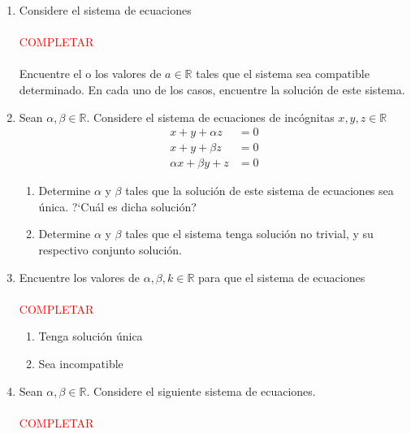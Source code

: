 \documentclass[11pt]{article}
\newcommand{\RR}{\mathbb{R}}
\begin{document}
\begin{enumerate}
  
\item Considere el sistema de ecuaciones%
  \\ \\
  
  \textcolor{red}{COMPLETAR}
  \\ \\
  
  Encuentre el o los valores de $a\in\RR$ tales que el sistema sea
  compatible determinado. En cada uno de los casos, encuentre la soluci\'on
  de este sistema.

\item Sean $\alpha,\beta\in\RR$.
  Considere el sistema de ecuaciones de incógnitas $x,y,z\in\RR$
  \begin{align*}
    x+y+\alpha z  &  =0\\
    x+y+\beta z  &  =0\\
    \alpha x+\beta y+z  &  =0
  \end{align*}
  
  
  \begin{enumerate}
  \item Determine $\alpha$ y $\beta$ tales que la soluci\'on de este sistema de
    ecuaciones sea \'unica. ?`Cu\'al es dicha soluci\'on?
    
  \item Determine $\alpha$ y $\beta$ tales que el sistema tenga soluci\'on no
    trivial, y su respectivo conjunto soluci\'on.
  \end{enumerate}
  
  
  
\item Encuentre los valores de $\alpha,\beta,k\in\RR$ para que
  el sistema de ecuaciones
  \\ \\
  
  \textcolor{red}{COMPLETAR}
          
  \begin{enumerate}
  \item Tenga soluci\'on \'unica
    
  \item Sea incompatible
  \end{enumerate}
  
  
\item Sean $\alpha,\beta\in\RR$. Considere el siguiente sistema de
  ecuaciones.
  \\ \\
  \textcolor{red}{COMPLETAR}
  

\end{enumerate}
\end{document}
